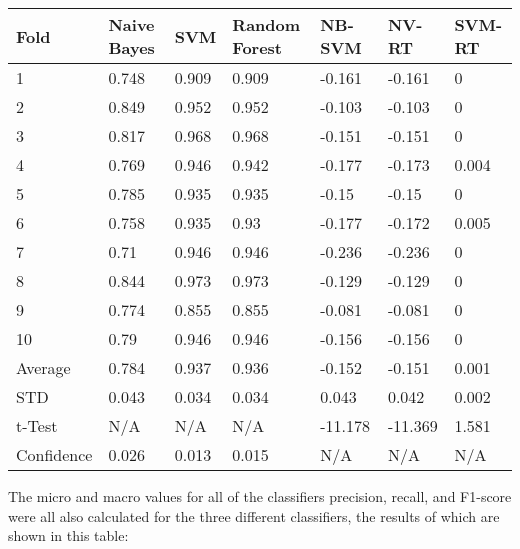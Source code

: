 \documentclass[11pt]{article}
\begin{document}
\begin{center}
\begin{longtable}{| l | l | l | l | l | l | l |}
\hline
Fold       & Naive Bayes & SVM   & Random Forest & NB-SVM  & NV-RT   & SVM-RT \\
\hline
1          & 0.748       & 0.909 & 0.909         & -0.161  & -0.161  & 0      \\
2          & 0.849       & 0.952 & 0.952         & -0.103  & -0.103  & 0      \\
3          & 0.817       & 0.968 & 0.968         & -0.151  & -0.151  & 0      \\
4          & 0.769       & 0.946 & 0.942         & -0.177  & -0.173  & 0.004  \\
5          & 0.785       & 0.935 & 0.935         & -0.15   & -0.15   & 0      \\
6          & 0.758       & 0.935 & 0.93          & -0.177  & -0.172  & 0.005  \\
7          & 0.71        & 0.946 & 0.946         & -0.236  & -0.236  & 0      \\
8          & 0.844       & 0.973 & 0.973         & -0.129  & -0.129  & 0      \\
9          & 0.774       & 0.855 & 0.855         & -0.081  & -0.081  & 0      \\
10         & 0.79        & 0.946 & 0.946         & -0.156  & -0.156  & 0      \\
\hline
Average    & 0.784       & 0.937 & 0.936         & -0.152  & -0.151  & 0.001  \\
STD        & 0.043       & 0.034 & 0.034         & 0.043   & 0.042   & 0.002  \\
t-Test     & N/A         & N/A   & N/A           & -11.178 & -11.369 & 1.581  \\
\hline
Confidence & 0.026       & 0.013 & 0.015         & N/A     & N/A     & N/A    \\
\hline
\end{longtable}
\end{center}

The micro and macro values for all of the classifiers precision, recall, and F1-score were all also calculated for the three different classifiers, the results of which are shown in this table:
\end{document}
